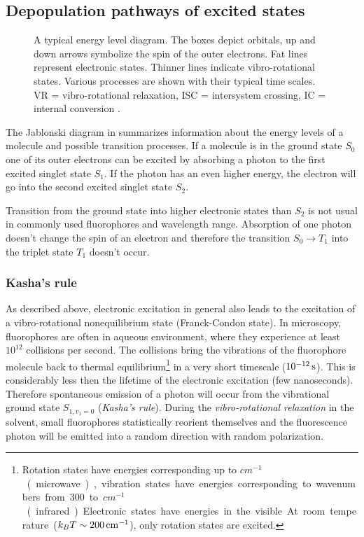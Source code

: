 \subsection{Depopulation pathways of excited states}
\begin{figure}[!hbt]
  \centering
  \def\svgscale{.8}
  
  \caption{A typical energy level diagram. The boxes depict orbitals,
    up and down arrows symbolize the spin of the outer electrons. Fat
    lines represent electronic states. Thinner lines indicate
    vibro-rotational states. Various processes are shown with their
    typical time scales. VR = vibro-rotational relaxation, ISC =
    intersystem crossing, IC = internal conversion \cite[inspired
    from][]{Haken2006}.}
  \label{fig:flu-level}
\end{figure}
The Jablonski diagram in  summarizes information
about the energy levels of a molecule and possible transition
processes. If a molecule is in the ground state $S_0$ one of its outer
electrons can be excited by absorbing a photon to the first excited
singlet state $S_1$.  If the photon has an even higher energy, the
electron will go into the second excited singlet state $S_2$.

Transition from the ground state into higher electronic states than
$S_2$ is not usual in commonly used fluorophores and wavelength range.
Absorption of one photon doesn't change the spin of an electron and
therefore the transition $S_0\rightarrow T_1$ into the triplet state
$T_1$ doesn't occur.

\subsubsection{Kasha's rule}
As described above, electronic excitation in general also leads to the
excitation of a vibro-rotational nonequilibrium state (Franck-Condon
state). In microscopy, fluorophores are often in aqueous environment,
where they experience at least $10^{12}$ collisions per second. The
collisions bring the vibrations of the fluorophore molecule back to
thermal equilibrium\footnote{Rotation states have energies
  corresponding up to \unit[100]{$cm^{-1}$} (microwave), vibration
  states have energies corresponding to wavenumbers from 300 to
  \unit[3000]{$cm^{-1}$} (infrared). Electronic states have energies
  in the visible. At room temperature ($k_B
  T\sim\unit[200]{cm^{-1}}$), only rotation states are excited.} in a
very short timescale ($\unit[10^{-12}]{s}$). This is considerably less
then the lifetime of the electronic excitation (few
nanoseconds). Therefore spontaneous emission of a photon will occur
from the vibrational ground state $S_{1,v_1=0}$ (\emph{Kasha's
  rule}). During the \emph{vibro-rotational relaxation} in the
solvent, small fluorophores statistically reorient themselves and the
fluorescence photon will be emitted into a random direction with
random polarization.

